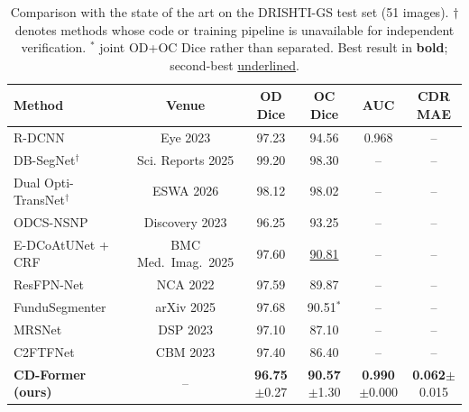 
\begin{table}[t]
\centering
\caption{Comparison with the state of the art on the DRISHTI-GS test set (51 images). 
$\dagger$ denotes methods whose code or training pipeline is unavailable for independent verification.
$^{\ast}$ joint OD+OC Dice rather than separated. Best result in \textbf{bold}; second-best \underline{underlined}.}
\label{tab:drishti}
\setlength{\tabcolsep}{4pt}
\begin{tabular}{lccccc}
\toprule
\textbf{Method} & \textbf{Venue} & \textbf{OD Dice} & \textbf{OC Dice} & \textbf{AUC} & \textbf{CDR MAE} \\
\midrule
R-DCNN~\cite{li2023rdcnn}                & Eye 2023        & 97.23 & 94.56 & 0.968 & -- \\
DB-SegNet$^\dagger$~\cite{dbsegnet2025}   & Sci. Reports 2025 & 99.20 & 98.30 & --    & -- \\
Dual Opti-TransNet$^\dagger$~\cite{dualoptitrans2026} & ESWA 2026 & 98.12 & 98.02 & --    & -- \\
ODCS-NSNP~\cite{odcsnsnp2023}            & Discovery 2023   & 96.25 & 93.25 & --    & -- \\
E-DCoAtUNet + CRF~\cite{edcoatunet2025}  & BMC Med.\ Imag.\ 2025 & 97.60 & \underline{90.81} & --    & -- \\
ResFPN-Net~\cite{resfpnnet2022}          & NCA 2022         & 97.59 & 89.87 & --    & -- \\
FunduSegmenter~\cite{fundusegmenter2025} & arXiv 2025       & 97.68 & 90.51$^\ast$ & -- & -- \\
MRSNet~\cite{mrsnet2023}                 & DSP 2023         & 97.10 & 87.10 & --    & -- \\
C2FTFNet~\cite{c2ftfnet2023}             & CBM 2023         & 97.40 & 86.40 & --    & -- \\
\midrule
\textbf{CD-Former (ours)} & --             & \textbf{96.75}$\pm$0.27 & \textbf{90.57}$\pm$1.30 & \textbf{0.990}$\pm$0.000 & \textbf{0.062}$\pm$0.015 \\
\bottomrule
\end{tabular}
\end{table}


